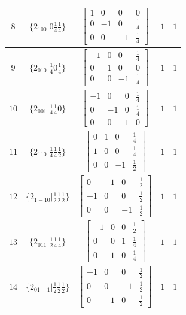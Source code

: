 \documentclass[fleqn,8pt]{jsarticle}
\begin{document}
\begin{longtable}{ccccc}
$ 8 $ & $ \{2{}_{100}|0 \frac{1}{4} \frac{1}{4}\} $ & $ \begin{bmatrix} 1 & 0 & 0 & 0 \\ 0 & -1 & 0 & \frac{1}{4} \\ 0 & 0 & -1 & \frac{1}{4} \end{bmatrix} $ & $ 1 $ & $ 1 $ \\ \hline
$ 9 $ & $ \{2{}_{010}|\frac{1}{4} 0 \frac{1}{4}\} $ & $ \begin{bmatrix} -1 & 0 & 0 & \frac{1}{4} \\ 0 & 1 & 0 & 0 \\ 0 & 0 & -1 & \frac{1}{4} \end{bmatrix} $ & $ 1 $ & $ 1 $ \\ \hline
$ 10 $ & $ \{2{}_{001}|\frac{1}{4} \frac{1}{4} 0\} $ & $ \begin{bmatrix} -1 & 0 & 0 & \frac{1}{4} \\ 0 & -1 & 0 & \frac{1}{4} \\ 0 & 0 & 1 & 0 \end{bmatrix} $ & $ 1 $ & $ 1 $ \\ \hline
$ 11 $ & $ \{2{}_{110}|\frac{1}{4} \frac{1}{4} \frac{1}{2}\} $ & $ \begin{bmatrix} 0 & 1 & 0 & \frac{1}{4} \\ 1 & 0 & 0 & \frac{1}{4} \\ 0 & 0 & -1 & \frac{1}{2} \end{bmatrix} $ & $ 1 $ & $ 1 $ \\ \hline
$ 12 $ & $ \{2{}_{1-10}|\frac{1}{2} \frac{1}{2} \frac{1}{2}\} $ & $ \begin{bmatrix} 0 & -1 & 0 & \frac{1}{2} \\ -1 & 0 & 0 & \frac{1}{2} \\ 0 & 0 & -1 & \frac{1}{2} \end{bmatrix} $ & $ 1 $ & $ 1 $ \\ \hline
$ 13 $ & $ \{2{}_{011}|\frac{1}{2} \frac{1}{4} \frac{1}{4}\} $ & $ \begin{bmatrix} -1 & 0 & 0 & \frac{1}{2} \\ 0 & 0 & 1 & \frac{1}{4} \\ 0 & 1 & 0 & \frac{1}{4} \end{bmatrix} $ & $ 1 $ & $ 1 $ \\ \hline
$ 14 $ & $ \{2{}_{01-1}|\frac{1}{2} \frac{1}{2} \frac{1}{2}\} $ & $ \begin{bmatrix} -1 & 0 & 0 & \frac{1}{2} \\ 0 & 0 & -1 & \frac{1}{2} \\ 0 & -1 & 0 & \frac{1}{2} \end{bmatrix} $ & $ 1 $ & $ 1 $ \\ \hline

\end{longtable}
\end{document}
